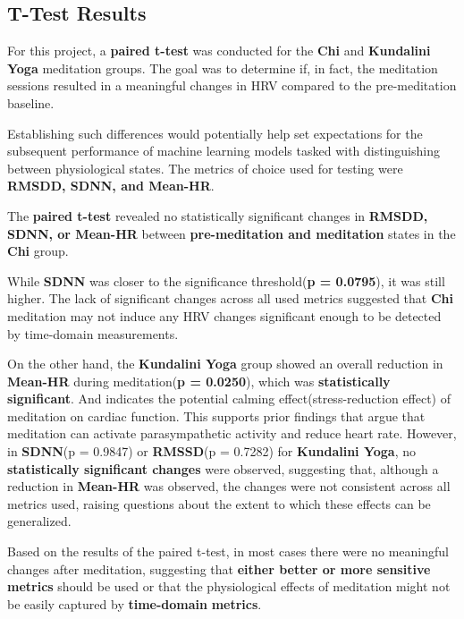 \documentclass[
  11pt,
]{ieee}
\begin{document}
\subsection{T-Test Results}\label{t-test-results}

\vspace{0.8em}

For this project, a \textbf{paired t-test} was conducted for the
\textbf{Chi} and \textbf{Kundalini Yoga} meditation groups. The goal was
to determine if, in fact, the meditation sessions resulted in a
meaningful changes in HRV compared to the pre-meditation baseline.

Establishing such differences would potentially help set expectations
for the subsequent performance of machine learning models tasked with
distinguishing between physiological states. The metrics of choice used
for testing were \textbf{RMSDD, SDNN, and Mean-HR}.

The \textbf{paired t-test} revealed no statistically significant changes
in \textbf{RMSDD, SDNN, or Mean-HR} between \textbf{pre-meditation and
meditation} states in the \textbf{Chi} group.

While \textbf{SDNN} was closer to the significance threshold(\textbf{p =
0.0795}), it was still higher. The lack of significant changes across
all used metrics suggested that \textbf{Chi} meditation may not induce
any HRV changes significant enough to be detected by time-domain
measurements.

On the other hand, the \textbf{Kundalini Yoga} group showed an overall
reduction in \textbf{Mean-HR} during meditation(\textbf{p = 0.0250}),
which was \textbf{statistically significant}. And indicates the
potential calming effect(stress-reduction effect) of meditation on
cardiac function. This supports prior findings that argue that
meditation can activate parasympathetic activity and reduce heart rate.
However, in \textbf{SDNN}(p = 0.9847) or \textbf{RMSSD}(p = 0.7282) for
\textbf{Kundalini Yoga}, no \textbf{statistically significant changes}
were observed, suggesting that, although a reduction in \textbf{Mean-HR}
was observed, the changes were not consistent across all metrics used,
raising questions about the extent to which these effects can be
generalized.

Based on the results of the paired t-test, in most cases there were no
meaningful changes after meditation, suggesting that \textbf{either
better or more sensitive metrics} should be used or that the
physiological effects of meditation might not be easily captured by
\textbf{time-domain} \textbf{metrics}.
\end{document}
